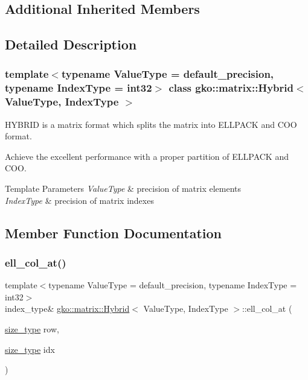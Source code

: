 \subsection*{Additional Inherited Members}


\subsection{Detailed Description}
\subsubsection*{template$<$typename Value\+Type = default\+\_\+precision, typename Index\+Type = int32$>$\newline
class gko\+::matrix\+::\+Hybrid$<$ Value\+Type, Index\+Type $>$}

H\+Y\+B\+R\+ID is a matrix format which splits the matrix into E\+L\+L\+P\+A\+CK and C\+OO format. 

Achieve the excellent performance with a proper partition of E\+L\+L\+P\+A\+CK and C\+OO.


\begin{DoxyTemplParams}{Template Parameters}
{\em Value\+Type} & precision of matrix elements \\
\hline
{\em Index\+Type} & precision of matrix indexes \\
\hline
\end{DoxyTemplParams}


\subsection{Member Function Documentation}
\mbox{\label{classgko_1_1matrix_1_1Hybrid_ad41c68dbda50589378ad481c0ab8feea}} 
\subsubsection{\texorpdfstring{ell\+\_\+col\+\_\+at()}{ell\_col\_at()}\hspace{0.1cm}{\footnotesize\ttfamily [1/2]}}
{\footnotesize\ttfamily template$<$typename Value\+Type = default\+\_\+precision, typename Index\+Type = int32$>$ \\
index\+\_\+type\& \hyperlink{classgko_1_1matrix_1_1Hybrid}{gko\+::matrix\+::\+Hybrid}$<$ Value\+Type, Index\+Type $>$\+::ell\+\_\+col\+\_\+at (\begin{DoxyParamCaption}\item[{\hyperlink{namespacegko_a6e5c95df0ae4e47aab2f604a22d98ee7}{size\+\_\+type}}]{row,  }\item[{\hyperlink{namespacegko_a6e5c95df0ae4e47aab2f604a22d98ee7}{size\+\_\+type}}]{idx }\end{DoxyParamCaption})\hspace{0.3cm}{\ttfamily [noexcept]}}



